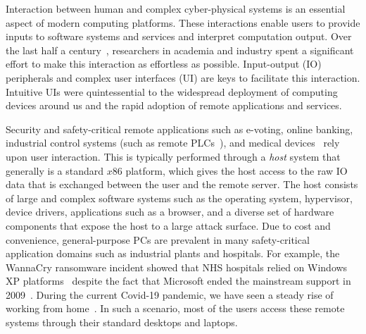 Interaction between human and complex cyber-physical systems is an essential aspect of modern computing platforms. These interactions enable users to provide inputs to software systems and services and interpret computation output. Over the last half a century~\cite{hci_history_1,hci_history_2}, researchers in academia and industry spent a significant effort to make this interaction as effortless as possible. Input-output (IO) peripherals and complex user interfaces (UI) are keys to facilitate this interaction. Intuitive UIs were quintessential to the widespread deployment of computing devices around us and the rapid adoption of remote applications and services. 

Security and safety-critical remote applications such as e-voting, online banking, industrial control systems (such as remote PLCs~\cite{controlbyweb}), and medical devices~\cite{medicalDevice} rely upon user interaction. This is typically performed through a \emph{host} system that generally is a standard $x86$ platform, which gives the host access to the raw IO data that is exchanged between the user and the remote server. The host consists of large and complex software systems such as the operating system, hypervisor, device drivers, applications such as a browser, and a diverse set of hardware components that expose the host to a large attack surface. Due to cost and convenience, general-purpose PCs are prevalent in many safety-critical application domains such as industrial plants and hospitals. For example, the WannaCry ransomware incident showed that NHS hospitals relied on Windows XP platforms~\cite{berry_2017,field_wannacry_2018} despite the fact that Microsoft ended the mainstream support in 2009~\cite{xp_support}. During the current Covid-19 pandemic, we have seen a steady rise of working from home~\cite{covid_work}. In such a scenario, most of the users access these remote systems through their standard desktops and laptops.


